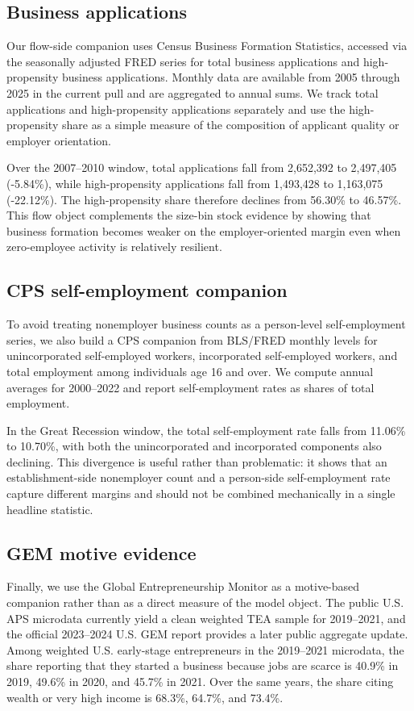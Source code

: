\subsection{Business applications}

Our flow-side companion uses Census Business Formation Statistics, accessed via
the seasonally adjusted FRED series for total business applications and
high-propensity business applications. Monthly data are available from 2005
through 2025 in the current pull and are aggregated to annual sums. We track
total applications and high-propensity applications separately and use the
high-propensity share as a simple measure of the composition of applicant
quality or employer orientation.

Over the 2007--2010 window, total applications fall from 2,652,392 to
2,497,405 (-5.84\%), while high-propensity applications fall from 1,493,428
to 1,163,075 (-22.12\%). The high-propensity share therefore declines from
56.30\% to 46.57\%. This flow object complements the size-bin stock evidence by
showing that business formation becomes weaker on the employer-oriented margin
even when zero-employee activity is relatively resilient.

\subsection{CPS self-employment companion}

To avoid treating nonemployer business counts as a person-level
self-employment series, we also build a CPS companion from BLS/FRED monthly
levels for unincorporated self-employed workers, incorporated self-employed
workers, and total employment among individuals age 16 and over. We compute
annual averages for 2000--2022 and report self-employment rates as shares of
total employment.

In the Great Recession window, the total self-employment rate falls from
11.06\% to 10.70\%, with both the unincorporated and incorporated components
also declining. This divergence is useful rather than problematic: it shows
that an establishment-side nonemployer count and a person-side
self-employment rate capture different margins and should not be combined
mechanically in a single headline statistic.

\subsection{GEM motive evidence}

Finally, we use the Global Entrepreneurship Monitor as a motive-based
companion rather than as a direct measure of the model object. The public U.S.
APS microdata currently yield a clean weighted TEA sample for 2019--2021, and
the official 2023--2024 U.S. GEM report provides a later public aggregate
update. Among weighted U.S. early-stage entrepreneurs in the 2019--2021
microdata, the share reporting that they started a business because jobs are
scarce is 40.9\% in 2019, 49.6\% in 2020, and 45.7\% in 2021. Over the same
years, the share citing wealth or very high income is 68.3\%, 64.7\%, and
73.4\%.

